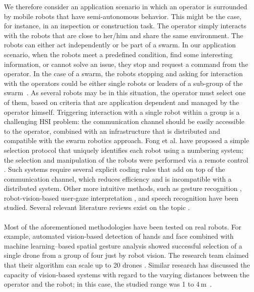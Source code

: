 \documentclass[smallextended]{svjour3}
\begin{document}
We therefore consider an application scenario in which an operator is surrounded by mobile robots that have semi-autonomous behavior. This might be the case, for instance, in an inspection or construction task. 
The operator simply interacts with the robots that are close to her/him and share the same environment. 
The robots can either act independently or be part of a swarm. 
In our application scenario, when the robots meet a predefined condition, find some interesting information, or cannot solve an issue, they stop and request a command from the operator. In the case of a swarm, the robots stopping and asking for interaction with the operators could be either single robots or leaders of a sub-group of the swarm~\cite{Goodrich2012}. 
As several robots may be in this situation, the operator must select one of them, based on criteria that are application dependent and managed by the operator himself. Triggering interaction with a single robot within a group is a challenging HSI problem: the communication channel should be easily accessible to the operator, combined with an infrastructure that is distributed and compatible with the swarm robotics approach.
Fong et al. have proposed a simple selection protocol that uniquely identifies each robot using a numbering system; the selection and manipulation of the robots were performed via a remote control \cite{fong2003}. 
Such systems require several explicit coding rules that add on top of the communication channel, which reduces efficiency and is incompatible with a distributed system. 
Other more intuitive methods, such as gesture recognition \cite{Couture-Beil2010,Jones2010,Monajjemi2013,Nagietal2014}, robot-vision-based user-gaze interpretation \cite{Couture-Beil2010,Monajjemi2013,Pourmehr2013}, and speech recognition \cite{Pourmehr2013} have been studied. 
Several relevant literature reviews exist on the topic \cite{goodrich2007human,Kolling2016,yanco2004classifying}.\\
\\
Most of the aforementioned methodologies have been tested on real robots. 
For example, automated vision-based detection of hands and face combined with machine learning--based spatial gesture analysis showed successful selection of a single drone from a group of four just by robot vision. 
The research team claimed that their algorithm can scale up to 20 drones \cite{Nagietal2014}. Similar research has discussed the capacity of vision-based systems with regard to the varying distances between the operator and the robot; in this case, the studied range was 1 to 4\,m~\cite{Couture-Beil2010}. 
\end{document}
